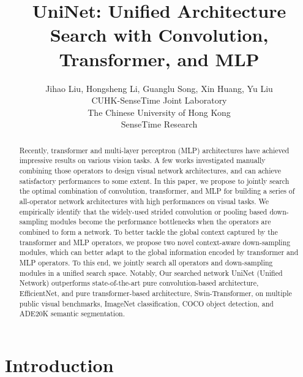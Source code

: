 \documentclass{article} \usepackage{iclr2022_conference,times}
\title{UniNet: Unified Architecture Search with Convolution, Transformer, and MLP}
\author{Jihao Liu, Hongsheng Li, Guanglu Song, Xin Huang, Yu Liu \\  CUHK-SenseTime Joint Laboratory \\  The Chinese University of Hong Kong \\  SenseTime Research}
\begin{document}
\maketitle



\begin{abstract}
Recently, transformer and multi-layer perceptron (MLP) architectures have achieved impressive results on various vision tasks. A few works investigated manually combining those operators to design visual network architectures, and can achieve satisfactory performances to some extent. In this paper, we propose to 
jointly search the optimal combination of convolution, transformer, and MLP for building a series of all-operator network architectures with high performances on visual tasks.
We empirically identify that the widely-used strided convolution or pooling based down-sampling modules become the performance bottlenecks when the operators are combined to form a network. To better tackle the global context captured by the transformer and MLP operators, we propose two novel context-aware down-sampling modules, which can better adapt to the global information encoded by transformer and MLP operators. To this end, we jointly search all operators and down-sampling modules in a unified search space. Notably, Our searched network UniNet (Unified Network) outperforms state-of-the-art pure convolution-based architecture, EfficientNet, and pure transformer-based architecture, Swin-Transformer, on multiple public visual benchmarks, ImageNet classification, COCO object detection, and ADE20K semantic segmentation.  

\end{abstract}

\section{Introduction}
\label{introduction}
\end{document}
